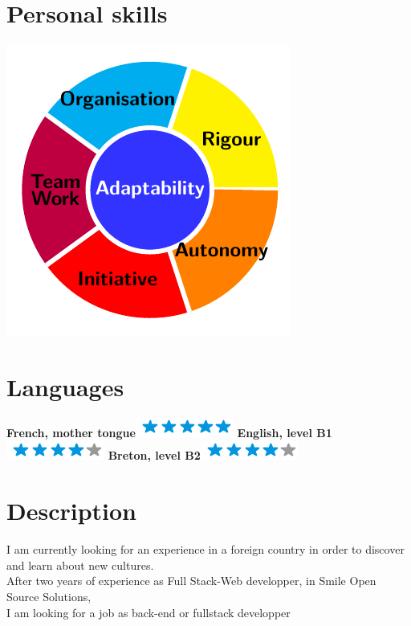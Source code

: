 \documentclass{friggeri-cv}
\begin{document}
\begin{aside}
	\section{Personal skills}
	\includegraphics[scale=0.70]{test.pdf}
	~
	\section{Languages}
	\textbf{French, mother tongue}\includegraphics[scale=0.40]{img/5stars.png}
	\textbf{English, level B1}\includegraphics[scale=0.40]{img/4stars.png}
	\textbf{Breton, level B2}\includegraphics[scale=0.40]{img/4stars.png}
\end{aside}

\section{Description}
\begin{entrylist}
	I am currently looking for an experience in a foreign country in order to discover \\
	and learn about new cultures. \\
    After two years of experience as Full Stack-Web developper, in Smile Open Source Solutions, \\
	I am looking for a job as back-end or fullstack developper \\
\end{entrylist}
\end{document}
